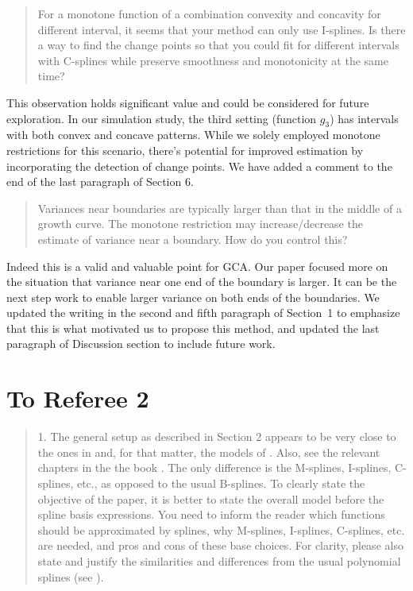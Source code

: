 \documentclass[12pt]{article}
\newenvironment{comment}%
{\begin{quotation}\noindent\small\it\ignorespaces%
  }{\end{quotation}}
\begin{document}
\begin{comment}
  For a monotone function of a combination convexity and concavity for
  different interval, it seems that your method can only use
  I-splines. Is there a way to find the change points so that you
  could fit for different intervals with C-splines while preserve
  smoothness and monotonicity at the same time?
\end{comment}

This observation holds significant value and could be considered for
future exploration. In our simulation study, the third setting
(function $g_3$) has intervals with both convex and concave
patterns. While we solely employed monotone restrictions for this
scenario, there's potential for improved estimation by incorporating
the detection of change points.  We have added a comment to the end of
the last paragraph of Section 6.


\begin{comment}
  Variances near boundaries are typically larger than that in the
  middle of a growth curve. The monotone restriction may
  increase/decrease the estimate of variance near a boundary. How do
  you control this?
\end{comment}

Indeed this is a valid and valuable point for GCA. Our paper focused
more on the situation that variance near one end of the boundary is
larger. It can be the next step work to enable larger variance on both ends
of the boundaries. We updated the writing in the second and fifth paragraph of
Section~1 to emphasize that this is what motivated us to propose this
method, and updated the last paragraph of Discussion section to
include future work.


\section{To Referee 2}

\begin{comment}
  1. The general setup as described in Section 2 appears to be very
  close to the ones in \cite{rice2001nonparametric} and,
  for that matter, the models of \cite{huang2002varying,
    huang2004polynomial}. Also, see the
  relevant chapters in the the book \cite{wu2018nonparametric}. The
  only difference is the M-splines, I-splines, C-splines, etc., as
  opposed to the usual B-splines. To clearly state the objective of
  the paper, it is better to state the overall model before the spline
  basis expressions. You need to inform the reader which functions
  should be approximated by splines, why M-splines, I-splines,
  C-splines, etc. are needed, and pros and cons of these base
  choices. For clarity, please also state and justify the similarities
  and differences from the usual polynomial splines (see
  \cite{wu2018nonparametric}).
\end{comment}
\end{document}
